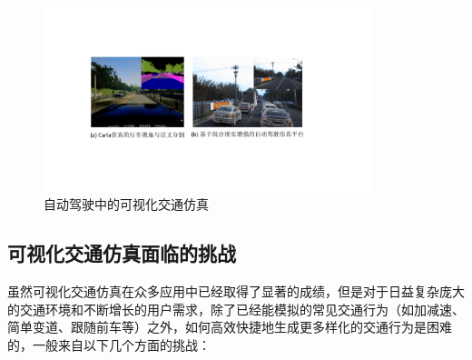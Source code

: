 \begin{figure}[!tbh]
\centering
\includegraphics[width=0.85\textwidth]{figure/intro/application.pdf}
\caption[自动驾驶中的可视化交通仿真]{
自动驾驶中的可视化交通仿真
}
\label{fig:intro_application}
\end{figure}



\subsection{可视化交通仿真面临的挑战}
\label{section:intro_challenge}

虽然可视化交通仿真在众多应用中已经取得了显著的成绩，但是对于日益复杂庞大的交通环境和不断增长的用户需求，除了已经能模拟的常见交通行为（如加减速、简单变道、跟随前车等）之外，如何高效快捷地生成更多样化的交通行为是困难的，一般来自以下几个方面的挑战：

